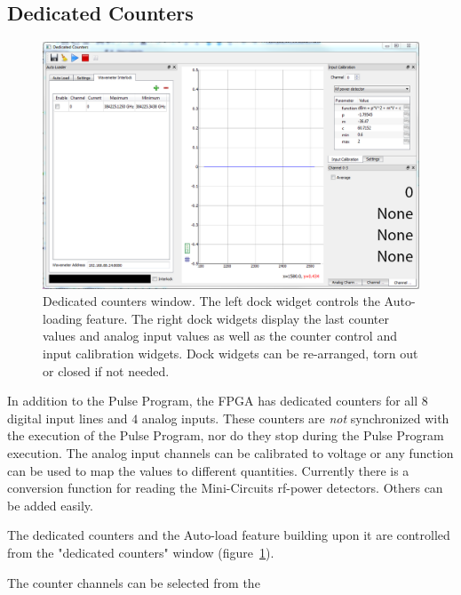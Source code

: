 \documentclass[11pt]{scrartcl}
\begin{document}
\subsection{Dedicated Counters}
\begin{figure}[htbp]
\begin{center}
\includegraphics[width=\textwidth]{DedicatedCounters}
\end{center}
\caption{\label{DedicatedCounters} Dedicated counters window. The left dock widget controls the Auto-loading feature. The right dock widgets display the last counter values and analog input values as well as the counter control and input calibration widgets. Dock widgets can be re-arranged, torn out or closed if not needed. }
\end{figure}
In addition to the Pulse Program, the FPGA has dedicated counters for all $8$ digital input lines and $4$ analog inputs. These counters are {\em not} synchronized with the execution of the Pulse Program, nor do they stop during the Pulse Program execution. The analog input channels can be calibrated to voltage or any function can be used to map the values to different quantities. Currently there is a conversion function for reading the Mini-Circuits rf-power detectors. Others can be added easily.

The dedicated counters and  the Auto-load feature building upon it are controlled from the "dedicated counters" window (figure~\ref{DedicatedCounters}). 

The counter channels can be selected from the 
\end{document}

